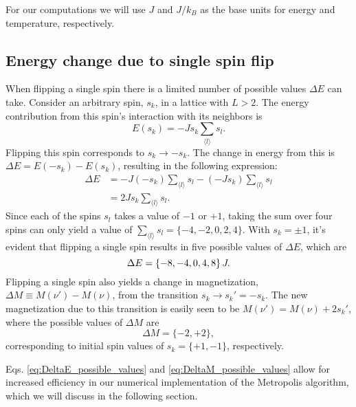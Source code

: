 For our computations we will use $J$ and $J/k_B$ as the base units for energy and temperature, respectively. 

\subsection{Energy change due to single spin flip}\label{subsec_implementations:de_from_single_flip}
When flipping a single spin there is a limited number of possible values $\Delta E$ can take. Consider an arbitrary spin, $s_k$, in a lattice with $L>2$. The energy contribution from this spin's interaction with its neighbors is 
\begin{equation}\label{eq:single_spin_energy}
    E(s_k) = -J s_k \sum_{\langle l \rangle} s_l.
\end{equation}   
Flipping this spin corresponds to $s_k\to -s_k$. The change in energy from this is $\Delta E=E(-s_k)-E(s_k)$, resulting in the following expression:
\begin{align}
        \Delta E &= -J(-s_k) \sum_{\langle l \rangle} s_l - (-J s_k) \sum_{\langle l \rangle} s_l \nonumber \\ 
        &= 2Js_k \sum_{\langle l \rangle} s_l. \label{eq:DeltaE_from_single_spin_flip}
\end{align}
Since each of the spins $s_l$ takes a value of $-1$ or $+1$, taking the sum over four spins can only yield a value of $\sum_{\langle l \rangle}s_l=\{-4,-2,0,2,4\}$. With $s_k=\pm1$, it's evident that flipping a single spin results in five possible values of $\Delta E$, which are 
\begin{equation}\label{eq:DeltaE_possible_values}
    \Delta E = \{-8,-4,0,4,8\}\,J. 
\end{equation}  
Flipping a single spin also yields a change in magnetization, $\Delta M\equiv M(\nu')-M(\nu)$, from the transition $s_k\to s_k'=-s_k$. The new magnetization due to this transition is easily seen to be $M(\nu') = M(\nu) + 2 s_k'$, where the possible values of $\Delta M$ are  
\begin{equation} \label{eq:DeltaM_possible_values}
    \Delta M=\{-2,+2\},
\end{equation} 
corresponding to initial spin values of $s_k=\{+1,-1\}$, respectively.   

Eqs. \eqref{eq:DeltaE_possible_values} and \eqref{eq:DeltaM_possible_values} allow for increased efficiency in our numerical implementation of the Metropolis algorithm, which we will discuss in the following section.  

